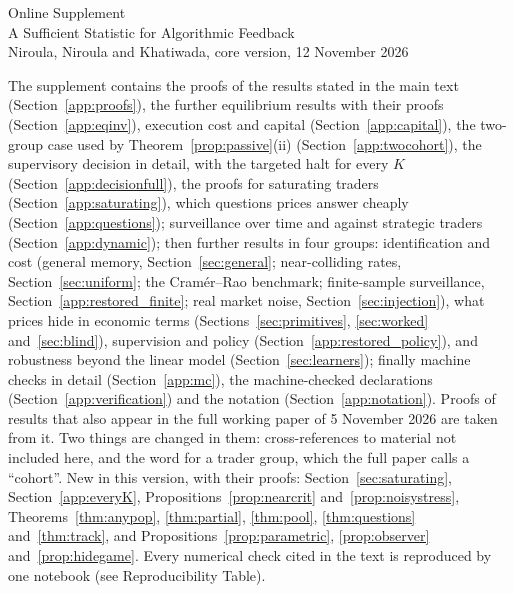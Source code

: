 \appendix
\clearpage
\singlespacing\small\sloppy
\renewcommand{\topfraction}{0.9}\renewcommand{\bottomfraction}{0.8}\renewcommand{\textfraction}{0.07}\renewcommand{\floatpagefraction}{0.75}
\setcounter{page}{1}\setcounter{table}{0}\setcounter{figure}{0}
\begin{center}{\Large Online Supplement}\\[4pt]{\large A Sufficient Statistic for Algorithmic Feedback}\\[2pt]{\normalsize Niroula, Niroula and Khatiwada, core version, 12 November 2026}\end{center}

\noindent The supplement contains the proofs of the results stated in the main text (Section~\ref{app:proofs}), the further equilibrium results with their proofs (Section~\ref{app:eqinv}), execution cost and capital (Section~\ref{app:capital}), the two-group case used by Theorem~\ref{prop:passive}(ii) (Section~\ref{app:twocohort}), the supervisory decision in detail, with the targeted halt for every $K$ (Section~\ref{app:decisionfull}), the proofs for saturating traders (Section~\ref{app:saturating}), which questions prices answer cheaply (Section~\ref{app:questions}); surveillance over time and against strategic traders (Section~\ref{app:dynamic}); then further results in four groups: identification and cost (general memory, Section~\ref{sec:general}; near-colliding rates, Section~\ref{sec:uniform}; the Cram\'er--Rao benchmark; finite-sample surveillance, Section~\ref{app:restored_finite}; real market noise, Section~\ref{sec:injection}), what prices hide in economic terms (Sections~\ref{sec:primitives}, \ref{sec:worked} and~\ref{sec:blind}), supervision and policy (Section~\ref{app:restored_policy}), and robustness beyond the linear model (Section~\ref{sec:learners}); finally machine checks in detail (Section~\ref{app:mc}), the machine-checked declarations (Section~\ref{app:verification}) and the notation (Section~\ref{app:notation}). Proofs of results that also appear in the full working paper of 5 November 2026 are taken from it. Two things are changed in them: cross-references to material not included here, and the word for a trader group, which the full paper calls a ``co\-hort''. New in this version, with their proofs: Section~\ref{sec:saturating}, Section~\ref{app:everyK}, Propositions~\ref{prop:nearcrit} and~\ref{prop:noisystress}, Theorems~\ref{thm:anypop}, \ref{thm:partial}, \ref{thm:pool}, \ref{thm:questions} and~\ref{thm:track}, and Propositions~\ref{prop:parametric}, \ref{prop:observer} and~\ref{prop:hidegame}. Every numerical check cited in the text is reproduced by one notebook (see Reproducibility Table).
